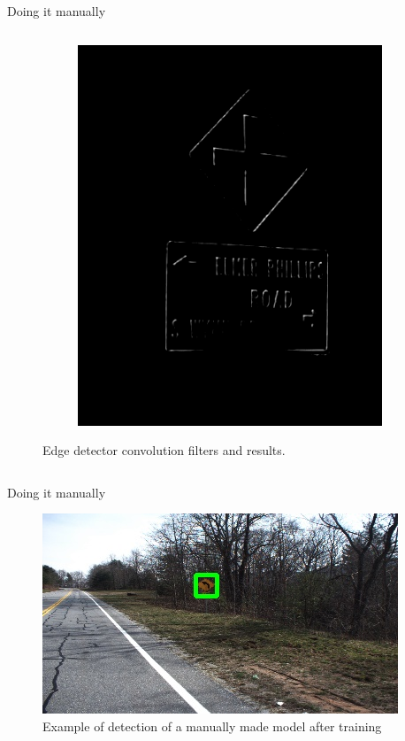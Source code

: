 \documentclass{beamer}
\begin{document}
\begin{frame}{Doing it manually}
\begin{columns}
\begin{column}{0.85\textwidth}
\begin{figure}
\begin{subfigure}[b]{0.22\textwidth}
          \includegraphics[width=\textwidth]{figures/manual_filters/edge_res_7.png}
      \end{subfigure}
      \caption{Edge detector convolution filters and results.}
    \end{figure}
  \end{column}
  \end{columns}
\end{frame}{}

\begin{frame}{Doing it manually}
    \begin{figure}
        \centering
        \includegraphics[width=0.8\linewidth]{figures/manual_filters/ex_im.jpg}
        \caption{Example of detection of a manually made model after training}
    \end{figure}{}
\end{frame}{}
\end{document}
